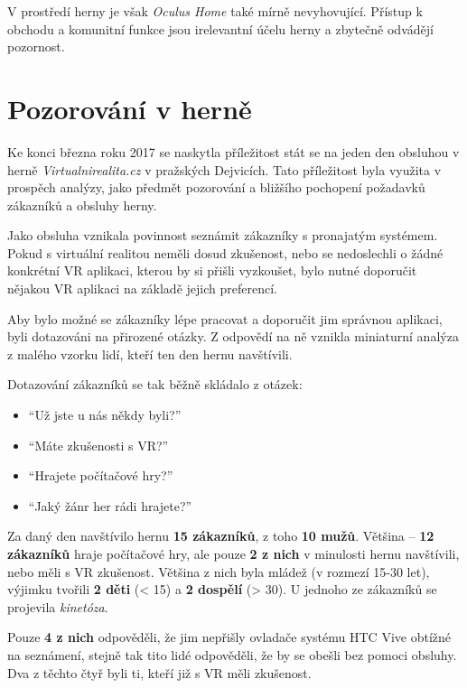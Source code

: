 V prostředí herny je však \emph{Oculus Home} také mírně nevyhovující.
Přístup k obchodu a komunitní funkce jsou irelevantní účelu herny a
zbytečně odvádějí pozornost.

\section{Pozorování v herně}\label{pozorovuxe1nuxed-v-hernux11b}

Ke konci března roku 2017 se naskytla příležitost stát se na jeden den
obsluhou v herně \emph{Virtualnirealita.cz} v pražských Dejvicích. Tato
příležitost byla využita v prospěch analýzy, jako předmět pozorování a
bližšího pochopení požadavků zákazníků a obsluhy herny.

Jako obsluha vznikala povinnost seznámit zákazníky s pronajatým
systémem. Pokud s virtuální realitou neměli dosud zkušenost, nebo se
nedoslechli o žádné konkrétní VR aplikaci, kterou by si přišli
vyzkoušet, bylo nutné doporučit nějakou VR aplikaci na základě jejich
preferencí.

Aby bylo možné se zákazníky lépe pracovat a doporučit jim správnou
aplikaci, byli dotazováni na přirozené otázky. Z odpovědí na ně vznikla
miniaturní analýza z malého vzorku lidí, kteří ten den hernu navštívili.

Dotazování zákazníků se tak běžně skládalo z otázek: 

\begin{itemize}
\tightlist
\item
``Už jste u nás
někdy byli?''
\item
  ``Máte zkušenosti s VR?''
\item
  ``Hrajete počítačové hry?''
\item
  ``Jaký žánr her rádi hrajete?''
\end{itemize}

Za daný den navštívilo hernu \textbf{15 zákazníků}, z toho \textbf{10
mužů}. Většina -- \textbf{12 zákazníků} hraje počítačové hry, ale pouze
\textbf{2 z nich} v minulosti hernu navštívili, nebo měli s VR
zkušenost. Většina z nich byla mládež (v rozmezí 15-30 let), výjimku
tvořili \textbf{2 děti} (\textless{} 15) a \textbf{2 dospělí}
(\textgreater{} 30). U jednoho ze zákazníků se projevila
\emph{kinetóza}.

Pouze \textbf{4 z nich} odpověděli, že jim nepřišly ovladače systému HTC
Vive obtížné na seznámení, stejně tak tito lidé odpověděli, že by se
obešli bez pomoci obsluhy. Dva z těchto čtyř byli ti, kteří již s VR
měli zkušenost.

